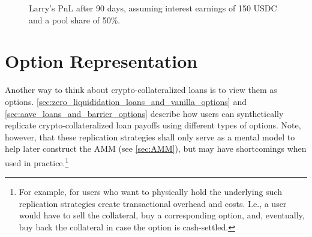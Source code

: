 \documentclass[a4paper]{article}
\begin{document}
\begin{figure}
\caption{\small Larry's PnL after 90 days, assuming interest earnings of 150 USDC and a pool share of 50\%.}
\label{fig:zero_liquidation_loan_deposit}
\end{figure}

\section{Option Representation}
Another way to think about crypto-collateralized loans is to view them as options. \cref{sec:zero_liquididation_loans_and_vanilla_options} and \cref{sec:aave_loans_and_barrier_options} describe how users can synthetically replicate crypto-collateralized loan payoffs using different types of options. Note, however, that these replication strategies shall only serve as a mental model to help later construct the AMM (see \cref{sec:AMM}), but may have shortcomings when used in practice.\footnote{For example, for users who want to physically hold the underlying such replication strategies create transactional overhead and costs. I.e., a user would have to sell the collateral, buy a corresponding option, and, eventually, buy back the collateral in case the option is cash-settled.}
\end{document}
